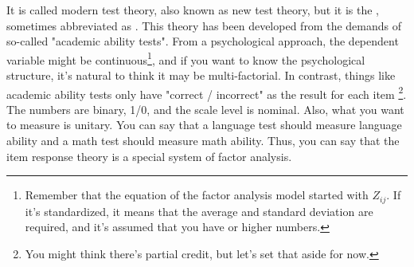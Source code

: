 \documentclass{ltjsbook}
\begin{document}
It is called modern test theory, also known as new test theory, but it is the , sometimes abbreviated as . This theory has been developed from the demands of so-called "academic ability tests". From a psychological approach, the dependent variable might be continuous\footnote{Remember that the equation of the factor analysis model started with $Z_{ij}$. If it's standardized, it means that the average and standard deviation are required, and it's assumed that you have  or higher numbers.}, and if you want to know the psychological structure, it's natural to think it may be multi-factorial. In contrast, things like academic ability tests only have "correct / incorrect" as the result for each item \footnote{You might think there's partial credit, but let's set that aside for now.}. The numbers are binary, 1/0, and the scale level is nominal. Also, what you want to measure is unitary. You can say that a language test should measure language ability and a math test should measure math ability. Thus, you can say that the item response theory is a special system of factor analysis.

\end{document}
